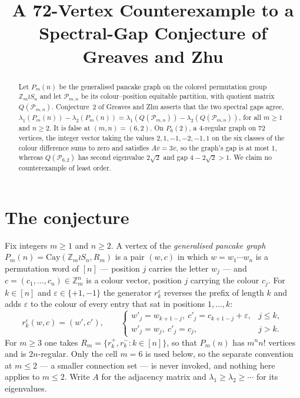 \documentclass[11pt]{amsart}
\title[A 72-vertex pancake counterexample]
{A 72-Vertex Counterexample to a Spectral-Gap Conjecture of Greaves and Zhu}
\date{}
\theoremstyle{remark}
\newcommand{\PP}{\mathcal P}
\newcommand{\Zm}{\mathbb Z_m}
\newcommand{\lam}{\lambda}
\begin{document}
\begin{abstract}
Let $P_m(n)$ be the generalised pancake graph on the colored permutation group
$\Zm\wr S_n$ and let $\PP_{m,n}$ be its colour--position equitable partition, with
quotient matrix $Q(\PP_{m,n})$. Conjecture~2 of Greaves and Zhu asserts that the two
spectral gaps agree,
$\lam_1(P_m(n))-\lam_2(P_m(n))=\lam_1(Q(\PP_{m,n}))-\lam_2(Q(\PP_{m,n}))$,
for all $m\ge1$ and $n\ge2$. It is false at $(m,n)=(6,2)$. On $P_6(2)$, a $4$-regular graph
on $72$ vertices, the integer vector taking the values $2,1,-1,-2,-1,1$ on the six classes of
the colour difference sums to zero and satisfies $Av=3v$, so the graph's gap is at most $1$,
whereas $Q(\PP_{6,2})$ has second eigenvalue $2\sqrt2$ and gap $4-2\sqrt2>1$. We claim no
counterexample of least order.
\end{abstract}

\maketitle

\section{The conjecture}

Fix integers $m\ge1$ and $n\ge2$. A vertex of the \emph{generalised pancake graph}
$P_m(n)=\mathrm{Cay}(\Zm\wr S_n,R_m)$ is a pair $(w,c)$ in which $w=w_1\cdots w_n$ is a
permutation word of $[n]$ --- position $j$ carries the letter $w_j$ --- and
$c=(c_1,\dots,c_n)\in\Zm^n$ is a colour vector, position $j$ carrying the colour $c_j$. For
$k\in[n]$ and $\varepsilon\in\{+1,-1\}$ the generator $r_k^{\varepsilon}$ reverses the prefix
of length $k$ and adds $\varepsilon$ to the colour of every entry that sat in positions
$1,\dots,k$:
\begin{equation}\label{eq:gen}
 r_k^{\varepsilon}(w,c)=(w',c'),\qquad
 \begin{cases}
  w'_j=w_{k+1-j},\ c'_j=c_{k+1-j}+\varepsilon,&j\le k,\\
  w'_j=w_j,\ c'_j=c_j,&j>k.
 \end{cases}
\end{equation}
For $m\ge3$ one takes $R_m=\{r_k^{+},r_k^{-}:k\in[n]\}$, so that $P_m(n)$ has $m^nn!$
vertices and is $2n$-regular. Only the cell $m=6$ is used below, so the separate convention at
$m\le2$ --- a smaller connection set --- is never invoked, and nothing here applies to
$m\le2$. Write $A$ for the adjacency matrix and $\lam_1\ge\lam_2\ge\cdots$ for its
eigenvalues.
\end{document}
